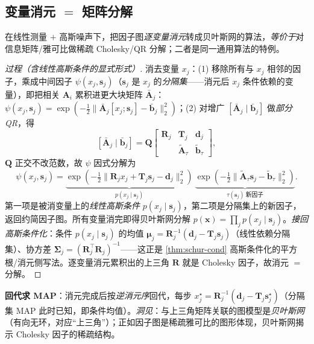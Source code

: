 \subsection{变量消元 \texorpdfstring{$=$}{=} 矩阵分解}
\label{sec:est-elimination}

\begin{theorem}[变量消元 $=$ 稀疏矩阵分解]\label{thm:elimination}
在线性测量 $+$ 高斯噪声下，把因子图\emph{逐变量消元}转成贝叶斯网的算法，\emph{等价于}对信息矩阵/雅可比做稀疏 Cholesky/QR 分解；二者是同一通用算法的特例。
\end{theorem}
\begin{proof}[过程（含线性高斯条件的显式形式）]
消去变量 $x_j$：(1) 移除所有与 $x_j$ 相邻的因子，乘成中间因子 $\psi(x_j,\mathbf{s}_j)$（$\mathbf{s}_j$ 是 $x_j$ 的\emph{分隔集}——消元后 $x_j$ 条件依赖的变量），即把相关 $\mathbf{A}_i$ 累积进更大块矩阵 $\bar{\mathbf{A}}_j$：$\psi(x_j,\mathbf{s}_j)=\exp(-\tfrac12\|\bar{\mathbf{A}}_j[x_j;\mathbf{s}_j]-\bar{\mathbf{b}}_j\|_2^2)$；(2) 对增广 $[\bar{\mathbf{A}}_j\mid\bar{\mathbf{b}}_j]$ 做\emph{部分 QR}，得
\[
  [\bar{\mathbf{A}}_j\mid\bar{\mathbf{b}}_j]=\mathbf{Q}\begin{bmatrix}\mathbf{R}_j&\mathbf{T}_j&\mathbf{d}_j\\&\tilde{\mathbf{A}}_\tau&\tilde{\mathbf{b}}_\tau\end{bmatrix},
\]
$\mathbf{Q}$ 正交不改范数，故 $\psi$ 因式分解为
\[
  \psi(x_j,\mathbf{s}_j)=\underbrace{\exp(-\tfrac12\|\mathbf{R}_j x_j+\mathbf{T}_j\mathbf{s}_j-\mathbf{d}_j\|_2^2)}_{p(x_j\mid\mathbf{s}_j)}\ \underbrace{\exp(-\tfrac12\|\tilde{\mathbf{A}}_\tau\mathbf{s}_j-\tilde{\mathbf{b}}_\tau\|_2^2)}_{\tau(\mathbf{s}_j)\ \text{新因子}}.
\]
第一项是被消变量上的\emph{线性高斯条件} $p(x_j\mid\mathbf{s}_j)$，第二项是分隔集上的新因子，返回约简因子图。所有变量消完即得贝叶斯网分解 $p(\mathbf{x})=\prod_j p(x_j\mid\mathbf{s}_j)$。\emph{接回高斯条件化}：条件 $p(x_j\mid\mathbf{s}_j)$ 的均值 $\boldsymbol{\mu}_j=\mathbf{R}_j^{-1}(\mathbf{d}_j-\mathbf{T}_j\mathbf{s}_j)$（线性依赖分隔集）、协方差 $\boldsymbol{\Sigma}_j=(\mathbf{R}_j^\top\mathbf{R}_j)^{-1}$——这正是 \cref{thm:schur-cond} 高斯条件化的平方根/消元侧写法。逐变量消元累积出的上三角 $\mathbf{R}$ 就是 Cholesky 因子，故消元 $=$ 分解。
\end{proof}
\noindent\textbf{回代求 MAP}：消元完成后按\emph{逆消元序}回代，每步 $x_j^\star=\mathbf{R}_j^{-1}(\mathbf{d}_j-\mathbf{T}_j\mathbf{s}_j^\star)$（分隔集 MAP 此时已知，即条件均值）。\emph{洞见}：与上三角矩阵关联的图模型是\emph{贝叶斯网}（有向无环，对应“上三角”）；正如因子图是稀疏雅可比的图形体现，贝叶斯网揭示 Cholesky 因子的稀疏结构。

